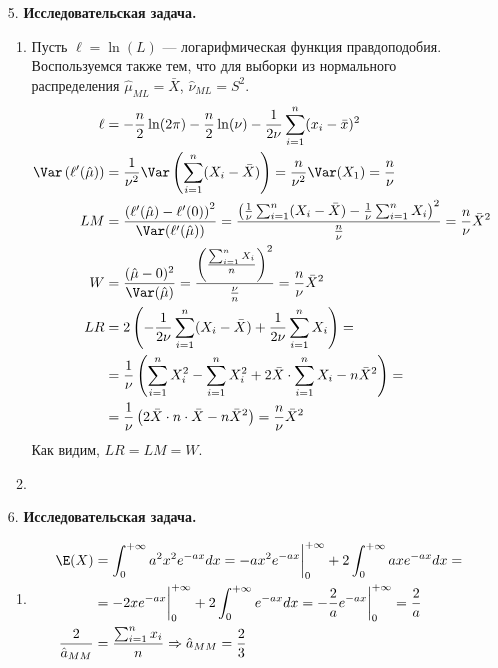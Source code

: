 \begin{enumerate}
\item[5.] \textbf{Исследовательская задача.}
\begin{enumerate}
\item
Пусть $\ell=\ln(L)$ — логарифмическая функция правдоподобия.
Воспользуемся также тем, что для выборки из нормального распределения
$\hat{\mu}_{ML}=\bar{X}$, $\hat{\nu}_{ML}=S^2$.
\begin{align*}
\ell &= -\frac{n}{2}\ln(2\pi) - \frac{n}{2}\ln(\nu) - \frac{1}{2\nu}\sum^n_{i=1}(x_i-\bar{x})^2 \\
\Var\left(\ell'(\hat{\mu})\right) &= \frac{1}{\nu^2} \Var\left(\sum^n_{i=1}(X_i-\bar{X})\right) = \frac{n}{\nu^2}\Var(X_1) = \frac{n}{\nu} \\
LM &= \frac{\left(\ell'(\hat{\mu}) - \ell'(0)\right)^2}{\Var(\ell'(\hat{\mu}))} = \frac{\left(\frac{1}{\nu}\sum^n_{i=1}(X_i-\bar{X})-\frac{1}{\nu}\sum^n_{i=1}X_i\right)^2}{\frac{n}{\nu}} = \frac{n}{\nu}\bar{X}^2 \\
W &= \frac{(\hat{\mu}-0)^2}{\Var(\hat{\mu})} = \frac{\left(\frac{\sum^n_{i=1}X_i}{n}\right)^2}{\frac{\nu}{n}}=\frac{n}{\nu}\bar{X}^2 \\
LR &= 2\left(-\frac{1}{2\nu}\sum^n_{i=1}(X_i-\bar{X}) + \frac{1}{2\nu}\sum^n_{i=1}X_i\right) = \\
&= \frac{1}{\nu}\left(\sum^n_{i=1}X^2_i-\sum^n_{i=1}X^2_i+2\bar{X} \cdot \sum^n_{i=1}X_i-n\bar{X}^2\right) = \\
&= \frac{1}{\nu} \left(2\bar{X}\cdot n\cdot\bar{X}-n\bar{X}^2\right)=\frac{n}{\nu}\bar{X}^2
\end{align*}
Как видим, $LR=LM=W$.
\item
\end{enumerate}

\item[6.] \textbf{Исследовательская задача.}

\begin{enumerate}

\item
\begin{align*}
\E(X) &= \int^{+\infty}_{0}a^2x^2e^{-ax} dx = -ax^2e^{-ax}\bigg|^{+\infty}_0 + 2\int^{+\infty}_{0}axe^{-ax} dx= \\
&= -2xe^{-ax}\bigg|^{+\infty}_0 + 2\int^{+\infty}_{0}e^{-ax} dx = -\frac{2}{a}e^{-ax}\bigg|^{+\infty}_0=\frac{2}{a} \\
\frac{2}{\hat{a}_{MM}} &= \frac{\sum^{n}_{i=1}x_i}{n} \Rightarrow \hat{a}_{MM}=\frac{2}{3}
\end{align*}


\end{enumerate}
\end{enumerate}
